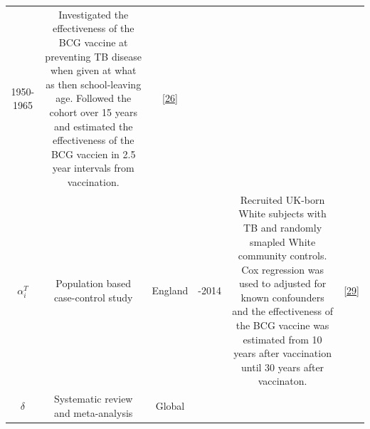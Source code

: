 \documentclass[11pt,twoside]{bristolthesis}
\begin{document}
\begin{longtable}[]{@{}cccccc@{}}
\begin{minipage}[t]{0.07\columnwidth}
  1950-1965\strut
  \end{minipage} & \begin{minipage}[t]{0.31\columnwidth}\centering
  Investigated the effectiveness of the BCG vaccine
  at preventing TB disease when given at what as
  then school-leaving age. Followed the cohort over
  15 years and estimated the effectiveness of the
  BCG vaccien in 2.5 year intervals from
  vaccination.\strut
  \end{minipage} & \begin{minipage}[t]{0.10\columnwidth}\centering
  {[}\protect\hyperlink{ref-Hart1972}{26}{]}\strut
  \end{minipage}\tabularnewline
  \begin{minipage}[t]{0.19\columnwidth}\centering
  \(\alpha_i^T\)\strut
  \end{minipage} & \begin{minipage}[t]{0.09\columnwidth}\centering
  Population
  based
  case-control
  study\strut
  \end{minipage} & \begin{minipage}[t]{0.07\columnwidth}\centering
  England\strut
  \end{minipage} & \begin{minipage}[t]{0.07\columnwidth}\centering
  2002-2014\strut
  \end{minipage} & \begin{minipage}[t]{0.31\columnwidth}\centering
  Recruited UK-born White subjects with TB and
  randomly smapled White community controls. Cox
  regression was used to adjusted for known
  confounders and the effectiveness of the BCG
  vaccine was estimated from 10 years after
  vaccination until 30 years after vaccinaton.\strut
  \end{minipage} & \begin{minipage}[t]{0.10\columnwidth}\centering
  {[}\protect\hyperlink{ref-Mangtani2017}{29}{]}\strut
  \end{minipage}\tabularnewline
  \begin{minipage}[t]{0.19\columnwidth}\centering
  \(\delta\)\strut
  \end{minipage} & \begin{minipage}[t]{0.09\columnwidth}\centering
  Systematic
  review and
  meta-analysis\strut
  \end{minipage} & \begin{minipage}[t]{0.07\columnwidth}\centering
  Global\strut
  \end{minipage} & \begin{minipage}[t]{0.07\columnwidth}\centering

\end{minipage}
\end{longtable}
\end{document}
